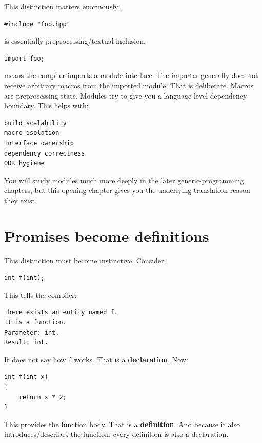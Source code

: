 This distinction matters enormously:

\begin{verbatim}
#include "foo.hpp"
\end{verbatim}

is essentially preprocessing/textual inclusion.

\begin{verbatim}
import foo;
\end{verbatim}

means the compiler imports a module interface. The importer generally does not receive arbitrary macros from the imported module. That is deliberate. Macros are preprocessing state. Modules try to give you a language-level dependency boundary. This helps with:

\begin{verbatim}
build scalability
macro isolation
interface ownership
dependency correctness
ODR hygiene
\end{verbatim}

You will study modules much more deeply in the later generic-programming chapters, but this opening chapter gives you the underlying translation reason they exist.

\section{Promises become definitions}\label{05-engine-i-ch002-promises-become-definitions}

This distinction must become instinctive. Consider:

\begin{verbatim}
int f(int);
\end{verbatim}

This tells the compiler:

\begin{verbatim}
There exists an entity named f.
It is a function.
Parameter: int.
Result: int.
\end{verbatim}

It does not say how \texttt{f} works. That is a \textbf{declaration}. Now:

\begin{verbatim}
int f(int x)
{
    return x * 2;
}
\end{verbatim}

This provides the function body. That is a \textbf{definition}. And because it also introduces/describes the function, every definition is also a declaration.

